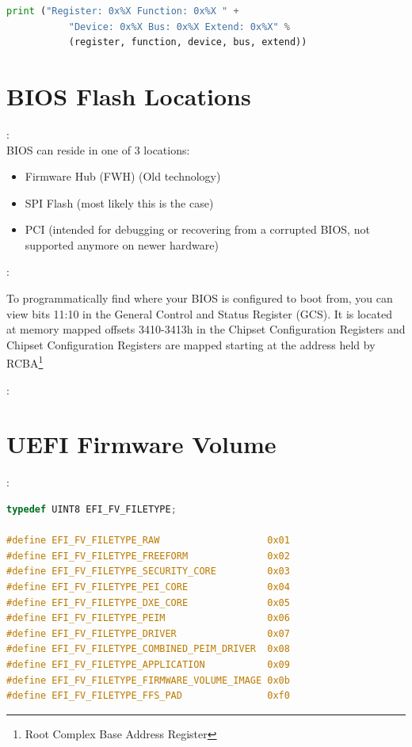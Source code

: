 \begin{note}
\begin{lstlisting}[language=Python]
	print ("Register: 0x%X Function: 0x%X " +
	       "Device: 0x%X Bus: 0x%X Extend: 0x%X" %
	       (register, function, device, bus, extend))
\end{lstlisting}
\end{note}


\section{BIOS Flash Locations}
\begin{note}:\\
BIOS can reside in one of 3 locations:
\begin{itemize}
	\item Firmware Hub (FWH) (Old technology)
	\item SPI Flash (most likely this is the case)
	\item PCI (intended for debugging or recovering from a corrupted BIOS, not supported anymore on newer hardware)
\end{itemize}

\end{note}
\begin{note}:
	
To programmatically find where your BIOS is configured to boot from, you can view bits 11:10 in the General Control and Status Register (GCS). It is located at memory mapped offsets 3410-3413h in the Chipset Configuration Registers and Chipset Configuration Registers are mapped starting at the address held by RCBA\footnote{Root Complex Base Address Register}
\end{note}

\begin{note}:
	
\end{note}

\section{UEFI Firmware Volume}
\begin{note}:
\begin{lstlisting}[language=C]
typedef UINT8 EFI_FV_FILETYPE;

#define EFI_FV_FILETYPE_RAW                   0x01
#define EFI_FV_FILETYPE_FREEFORM              0x02
#define EFI_FV_FILETYPE_SECURITY_CORE         0x03
#define EFI_FV_FILETYPE_PEI_CORE              0x04
#define EFI_FV_FILETYPE_DXE_CORE              0x05
#define EFI_FV_FILETYPE_PEIM                  0x06
#define EFI_FV_FILETYPE_DRIVER                0x07
#define EFI_FV_FILETYPE_COMBINED_PEIM_DRIVER  0x08
#define EFI_FV_FILETYPE_APPLICATION           0x09
#define EFI_FV_FILETYPE_FIRMWARE_VOLUME_IMAGE 0x0b
#define EFI_FV_FILETYPE_FFS_PAD               0xf0
\end{lstlisting}
\end{note}

